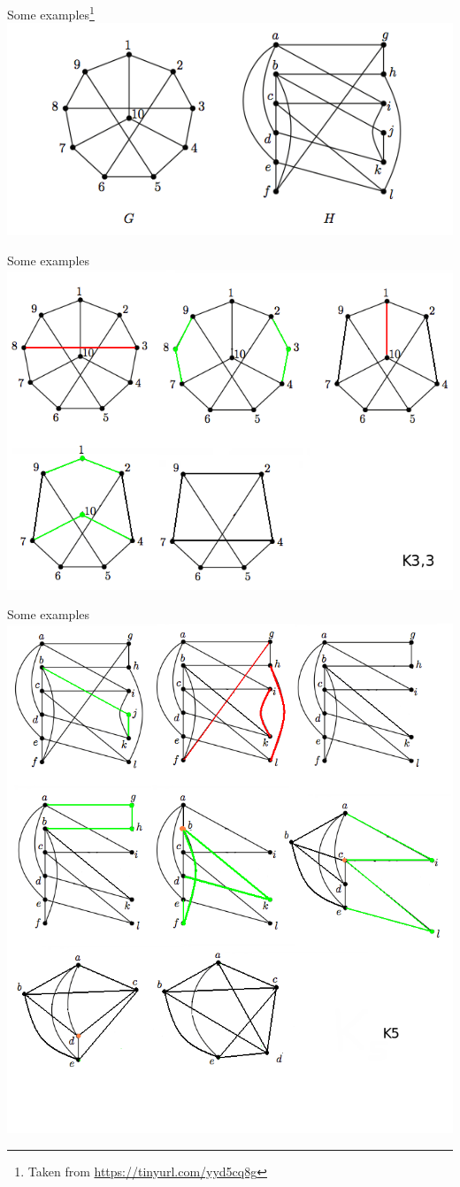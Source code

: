\documentclass{beamer}
\theoremstyle{definition}
\begin{document}
\begin{frame}{Some examples\footnote{{\tiny Taken from \url{https://tinyurl.com/yyd5cq8g}}}}
    \centering \includegraphics[width=.7\linewidth]{K1.png}
\end{frame}

\begin{frame}{Some examples}
    \centering \includegraphics[width=.7\linewidth]{K2.png}
\end{frame}

\begin{frame}{Some examples}
    \centering \includegraphics[width=.6\linewidth]{K3.png}
\end{frame}
\end{document}
